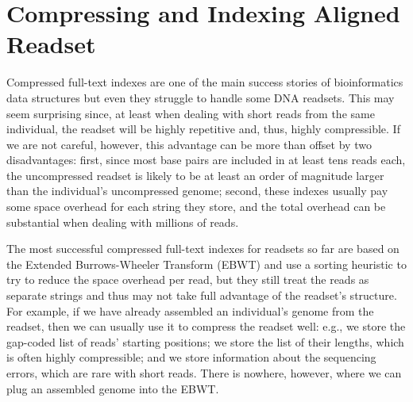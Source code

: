 \chapter{Compressing and Indexing Aligned Readset}

\newcommand{\inputXBWT}[1]{}
\newcommand{\figXBWT}[2]{\texttt{[image: Part\_Two/xbwt/\#2]}}

\begin{small}

Compressed full-text indexes are one of the main success stories of bioinformatics data structures but even they struggle to handle some DNA readsets.  This may seem surprising since, at least when dealing with short reads from the same individual, the readset will be highly repetitive and, thus, highly compressible.  If we are not careful, however, this advantage can be more than offset by two disadvantages: first, since most base pairs are included in at least tens reads each, the uncompressed readset is likely to be at least an order of magnitude larger than the individual's uncompressed genome; second, these indexes usually pay some space overhead for each string they store, and the total overhead can be substantial when dealing with millions of reads.


The most successful compressed full-text indexes for readsets so far are based on the Extended Burrows-Wheeler Transform (EBWT) and use a sorting heuristic to try to reduce the space overhead per read, but they still treat the reads as separate strings and thus may not take full advantage of the readset's structure.  For example, if we have already assembled an individual's genome from the readset, then we can usually use it to compress the readset well: e.g., we store the gap-coded list of reads' starting positions; we store the list of their lengths, which is often highly compressible; and we store information about the sequencing errors, which are rare with short reads.  There is nowhere, however, where we can plug an assembled genome into the EBWT.


\end{small}
